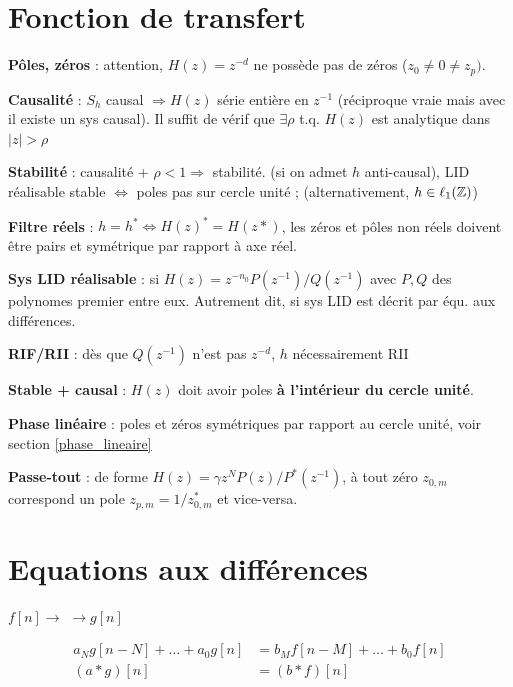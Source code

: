 
\section{Fonction de transfert}

\textbf{Pôles, zéros} : attention, $H(z)=z^{-d}$ ne possède pas de zéros ($z_0 \neq 0 \neq z_p)$.

\textbf{Causalité} : $S_h$ causal $\Rightarrow H(z)$ série entière en $z^{-1}$ (réciproque vraie mais avec il existe un sys causal). Il suffit de vérif que $\exists \rho $ t.q. $H(z)$ est analytique dans $|z|>\rho$

\textbf{Stabilité} : causalité + $\rho < 1 \Rightarrow$ stabilité. (si on admet $h$ anti-causal), LID réalisable stable $\iff$ poles pas sur cercle unité ; (alternativement, $h\in\ell_{1}(\mathbb{Z})$)

\textbf{Filtre réels} : $h=h^* \iff H(z)^* = H(z*)$, les zéros et pôles non réels doivent être pairs et symétrique par rapport à axe réel.

\textbf{Sys LID réalisable} : si $H(z) = z^{-n_0}P(z^{-1})/Q(z^{-1})$ avec $P,Q$ des polynomes premier entre eux. Autrement dit, si sys LID est décrit par équ. aux différences. 

\textbf{RIF/RII} : dès que $Q(z^{-1})$ n'est pas $z^{-d}$, $h$ nécessairement RII

\textbf{Stable + causal} : $H(z)$ doit avoir poles \textbf{à l'intérieur du cercle unité}.

\textbf{Phase linéaire} : poles et zéros symétriques par rapport au cercle unité, voir section \ref{phase_lineaire}

\textbf{Passe-tout} : de forme $H(z) = \gamma z^N P(z) / P^*(z^{-1})$, à tout zéro $z_{0,m}$ correspond un pole $z_{p,m} = 1/z^*_{0,m}$ et vice-versa.


\section{Equations aux différences}

$f[n]\rightarrow$  $\rightarrow g[n]$

\begin{align*}
    a_Ng[n-N] + \dots + a_0g[n] & = b_Mf[n-M] + \dots + b_0f[n]\\
    (a*g)[n] & = (b*f)[n]
\end{align*}

